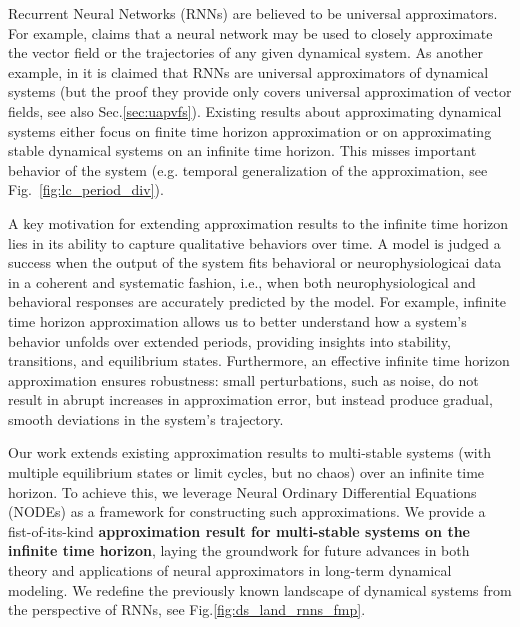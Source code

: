 \documentclass{article}
\newcounter{ct}
\begin{document}

Recurrent Neural Networks (RNNs) are believed to be universal approximators.
For example, \citet{durstewitz2023reconstructing} claims that 
 a neural network may be used to closely approximate the vector field or the trajectories of any given dynamical system.
As another example, in  \citep{dinc2025latentcomputing} it is claimed that RNNs are universal approximators of dynamical systems (but the proof they provide only covers universal approximation of vector fields, see also Sec.\ref{sec:uapvfs}). 
Existing results about approximating dynamical systems either focus on finite time horizon approximation or on approximating stable dynamical systems on an infinite time horizon.
This misses important behavior of the system (e.g. temporal generalization of the approximation, see Fig.~\ref{fig:lc_period_div}).

A key motivation for extending approximation results to the infinite time horizon lies in its ability to capture qualitative behaviors over time.
A model is judged a success when the output of the system fits behavioral or neurophysiologicai data in a coherent and systematic fashion, i.e., when both neurophysiological and behavioral responses are accurately predicted by the model.
 For example, infinite time horizon approximation allows us to better understand how a system's behavior unfolds over extended periods, providing insights into stability, transitions, and equilibrium states.
 Furthermore, an effective infinite time horizon approximation ensures robustness: small perturbations, such as noise, do not result in abrupt increases in approximation error, but instead produce gradual, smooth deviations in the system's trajectory.



Our work extends existing approximation results to multi-stable systems (with multiple equilibrium states or limit cycles, but no chaos) over an infinite time horizon. 
To achieve this, we leverage Neural Ordinary Differential Equations (NODEs) as a framework for constructing such approximations.
We provide a fist-of-its-kind \textbf{approximation result for multi-stable systems on the infinite time horizon}, laying the groundwork for future advances in both theory and applications of neural approximators in long-term dynamical modeling.
We redefine the previously known landscape of dynamical systems from the perspective of RNNs, see Fig.\ref{fig:ds_land_rnns_fmp}.
\end{document}
